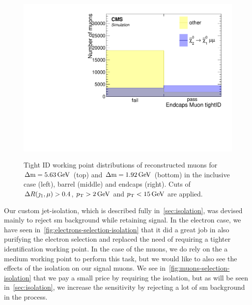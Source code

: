 \begin{figure}[!htb]
\includegraphics[width=0.32\linewidth]{plots/lepton_selection/lepton_selection_dm1p92/none_Muons_endcape_tight.pdf} \\
\caption[tight ID working point distribution of reconstructed muons]{Tight ID working point distributions of reconstructed muons for $\Delta\mathrm{m}=5.63\,\text{Ge\hspace{-.08em}V}$ (top) and $\Delta\mathrm{m}=1.92\,\text{Ge\hspace{-.08em}V}$ (bottom) in the inclusive \pt case (left), barrel (middle) and endcaps (right). Cuts of $\Delta R(\jmath_1,\mu)>0.4$, $p_{\mathrm{T}}>2\,\text{Ge\hspace{-.08em}V}$ and $p_{\mathrm{T}}<15\,\text{Ge\hspace{-.08em}V}$ are applied.}
\label{fig:muons-selection-id-tight}
\end{figure}

Our custom jet-isolation, which is described fully in~\ref{sec:isolation}, was devised mainly to reject \gls{sm} background while retaining signal. In the electron case, we have seen in~\ref{fig:electrons-selection-isolation} that it did a great job in also purifying the electron selection and replaced the need of requiring a tighter identification working point. In the case of the muons, we do rely on the a medium working point to perform this task, but we would like to also see the effects of the isolation on our signal muons. We see in~\ref{fig:muons-selection-isolation} that we pay a small price by requiring the isolation, but as will be seen in~\ref{sec:isolation}, we increase the sensitivity by rejecting a lot of \gls{sm} background in the process.

